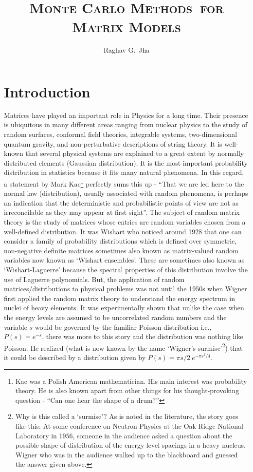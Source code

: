 \documentclass[letter,11pt]{article}
\title{\textsc{\LARGE{\LARGE{Monte Carlo Methods}~\large{for} \LARGE{Matrix Models}}}}
\author[a]{Raghav G.~Jha}
\affiliation{Perimeter Institute for Theoretical Physics, Waterloo, Ontario N2L 2Y5, Canada}
\begin{document}
\date{}
\maketitle

\section{Introduction}

Matrices have played an important role in Physics for a long time. Their presence is ubiquitous in many different areas ranging from nuclear physics to the study of random surfaces, 
conformal field theories, integrable systems, two-dimensional quantum gravity, and non-perturbative descriptions of string theory. It is well-known that several physical systems are explained to a great extent by normally distributed elements (Gaussian distribution). It is the most important probability 
distribution in statistics because it fits many natural phenomena.  In this regard, a statement by Mark Kac\footnote{Kac was a Polish American mathematician. His main interest was probability theory. He is also known apart from other things for his thought-provoking question - ``Can one hear 
the shape of a drum?''} perfectly sums this up - ``That we are led here to the normal law (distribution), usually associated with random phenomena, is perhaps
an indication that the deterministic and probabilistic points of view are not as irreconcilable as they may appear at first sight''. The subject of random matrix theory is the study of matrices whose entries are random variables chosen from a well-defined distribution. It was Wishart who 
noticed around 1928 that one can consider a family of 
probability distributions which is defined over symmetric, non-negative definite 
matrices sometimes also known as matrix-valued random variables 
now known as `Wishart ensembles'. These are sometimes also known 
as `Wishart-Laguerre' because the spectral properties of this distribution 
involve the use of Laguerre polynomials. But, the application of random matrices/distributions
to physical problems was not until the 1950s
when Wigner first applied the random matrix theory 
to understand the energy spectrum in nuclei of heavy elements. It was experimentally 
shown that unlike the case when the energy levels are assumed to be uncorrelated
random numbers and the variable $s$ would be governed by the familiar Poisson distribution 
i.e., $P(s) = e^{-s}$, there was more to this story and the distribution was nothing like Poisson. 
He realized (what is now known by the name `Wigner's surmise'\footnote{Why is this called a `surmise'? 
As is noted in the literature, the story goes like this: At some conference on Neutron Physics at the Oak 
Ridge National Laboratory in 1956, someone in the audience asked a question about the possible shape 
of distribution of the energy level spacings in a heavy nucleus. Wigner who was in the audience 
walked up to the blackboard and guessed the answer given above.}) that it could be described by a distribution given by $P(s) = \pi s/2~e^{-\pi s^2/4}$. 
\end{document}
